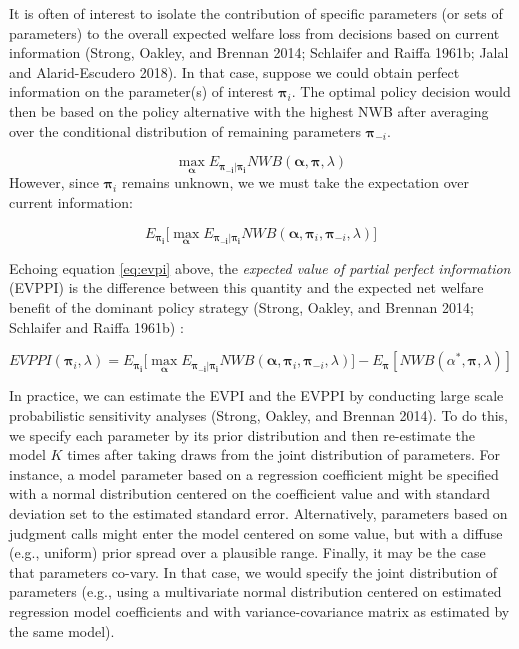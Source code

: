 \documentclass[
  10pt,
]{article}
\begin{document}
It is often of interest to isolate the contribution of specific
parameters (or sets of parameters) to the overall expected welfare loss
from decisions based on current information (Strong, Oakley, and Brennan
2014; Schlaifer and Raiffa 1961b; Jalal and Alarid-Escudero 2018). In
that case, suppose we could obtain perfect information on the
parameter(s) of interest \(\boldsymbol{\pi}_i\). The optimal policy
decision would then be based on the policy alternative with the highest
NWB after averaging over the conditional distribution of remaining
parameters \(\boldsymbol{\pi}_{-i}\).

\[
\max_{\boldsymbol{\alpha}} E_{\boldsymbol{\pi_{-i}}|\boldsymbol{\pi_i}}NWB(\boldsymbol{\alpha},\boldsymbol{\pi},\lambda) 
\] However, since \(\boldsymbol{\pi}_i\) remains unknown, we we must
take the expectation over current information:

\[
E_{\boldsymbol{\pi_i}} \big [  \max_{\boldsymbol{\alpha}} E_{\boldsymbol{\pi_{-i}}|\boldsymbol{\pi_i}}NWB(\boldsymbol{\alpha},\boldsymbol{\pi}_i,\boldsymbol{\pi}_{-i},\lambda) \big ]
\]

Echoing equation \ref{eq:evpi} above, the \emph{expected value of
partial perfect information} (EVPPI) is the difference between this
quantity and the expected net welfare benefit of the dominant policy
strategy (Strong, Oakley, and Brennan 2014; Schlaifer and Raiffa 1961b)
:

\begin{equation}
\label{eq:evppi}
EVPPI(\boldsymbol{\pi}_i,\lambda) = E_{\boldsymbol{\pi_i}} \big [  \max_{\boldsymbol{\alpha}} E_{\boldsymbol{\pi_{-i}}|\boldsymbol{\pi_i}}NWB(\boldsymbol{\alpha},\boldsymbol{\pi}_i,\boldsymbol{\pi}_{-i},\lambda) \big ] - 
E_{\boldsymbol{\pi}}[NWB(\alpha^*,\boldsymbol{\pi},\lambda)]
\end{equation}

In practice, we can estimate the EVPI and the EVPPI by conducting large
scale probabilistic sensitivity analyses (Strong, Oakley, and Brennan
2014). To do this, we specify each parameter by its prior distribution
and then re-estimate the model \(K\) times after taking draws from the
joint distribution of parameters. For instance, a model parameter based
on a regression coefficient might be specified with a normal
distribution centered on the coefficient value and with standard
deviation set to the estimated standard error. Alternatively, parameters
based on judgment calls might enter the model centered on some value,
but with a diffuse (e.g., uniform) prior spread over a plausible range.
Finally, it may be the case that parameters co-vary. In that case, we
would specify the joint distribution of parameters (e.g., using a
multivariate normal distribution centered on estimated regression model
coefficients and with variance-covariance matrix as estimated by the
same model).
\end{document}
